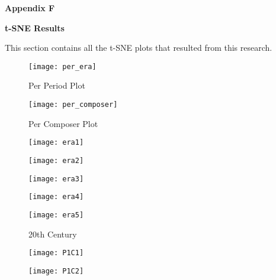 \textbf{\Huge Appendix F}
\bigskip

\textbf{\LARGE t-SNE Results}

\bigskip
This section contains all the t-SNE plots that resulted from this research.


\begin{figure}[!htb]
\caption{Per Period Plot}
\centering
\texttt{[image: per\_era]}
\end{figure}

\begin{figure}[!htb]
\caption{Per Composer Plot}
\centering
\texttt{[image: per\_composer]}
\end{figure}

\begin{figure}
\centering
\begin{minipage}{.5\textwidth}
  \centering
  \texttt{[image: era1]}
  \label{fig:test1}
\end{minipage}%
\begin{minipage}{.5\textwidth}
  \centering
  \texttt{[image: era2]}
  \label{fig:test2}
\end{minipage}
\end{figure}

\begin{figure}
\centering
\begin{minipage}{.5\textwidth}
  \centering
  \texttt{[image: era3]}
  \label{fig:test1}
\end{minipage}%
\begin{minipage}{.5\textwidth}
  \centering
  \texttt{[image: era4]}
  \label{fig:test2}
\end{minipage}
\end{figure}

\begin{figure}[h]
\caption{20th Century}
\centering
\texttt{[image: era5]}
\end{figure}

\begin{figure}
\centering
\begin{minipage}{.5\textwidth}
  \centering
  \texttt{[image: P1C1]}
  \label{fig:test1}
\end{minipage}%
\begin{minipage}{.5\textwidth}
  \centering
  \texttt{[image: P1C2]}
  \label{fig:test2}
\end{minipage}
\end{figure}

